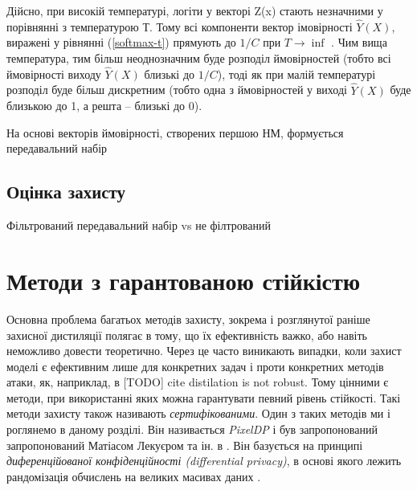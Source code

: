 \documentclass[14pt,a4paper]{extarticle}
\newcounter{e}
\numberwithin{equation}{section}
\numberwithin{figure}{section}
\begin{document}
 Дійсно, при високій температурі, логіти у векторі Z(x) стають незначними
 у порівнянні з температурою $Т$. Тому всі компоненти
 вектор імовірності $\hat{Y}(X)$, виражені у рівнянні (\ref{softmax-t}) прямують до 
 $1/C$ при $T \to \inf$ . Чим вища температура,
 тим більш неоднозначним буде розподіл ймовірностей (тобто всі
 ймовірності виходу $\hat{Y}(X)$ близькі до $1/C$), тоді як
 при малій температурі розподіл буде більш дискретним (тобто одна з ймовірностей у
 виході $\hat{Y}(X)$ буде близькою до 1, а решта -- близькі до 0).
 
 
 На основі векторів ймовірності, створених першою НМ, формується передавальний набір
 
 

 
 \subsection{Оцінка захисту}
 
 Фільтрований передавальний набір vs не філтрований
 
 \newpage
 \thispagestyle{empty}
 \section{Методи з гарантованою стійкістю}
 Основна проблема багатьох методів захисту, зокрема і розглянутої раніше захисної дистиляції полягає в тому, що їх ефективність важко, або навіть неможливо довести теоретично. Через це часто виникають випадки, коли захист моделі є ефективним лише для конкретних задач і проти конкретних методів атаки,
 як, наприклад, в [TODO] cite distilation is not robust. Тому цінними є методи, при використанні яких можна гарантувати певний рівень стійкості. Такі методи захисту також називають \textit{сертифікованими}. Один з таких методів ми і роглянемо в даному розділі. Він називається \textit{PixelDP} і був запропонований  запропонований Матіасом Лекуєром та ін. в \cite{pixeldp}. Він базується на принципі \textit{диференційованої конфіденційності (differential privacy)}, в основі якого лежить рандомізація обчислень на великих масивах даних \cite{differential-privacy}.
 
\end{document}
